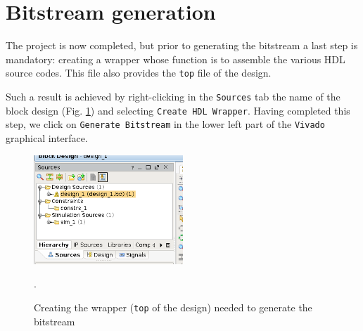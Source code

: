 \documentclass[10pt,oneside]{article}
\begin{document}
%

\section{Bitstream generation}

The project is now completed, but prior to generating the bitstream a last step
is mandatory: creating a wrapper whose function is to assemble the various HDL source
codes. This file also provides the {\tt top} file of the design.

Such a result is achieved by right-clicking in the {\tt Sources} tab the name
of the block design (Fig. \ref{createHDLWrapper}) and selecting {\tt Create HDL Wrapper}.
Having completed this step, we click on {\tt Generate Bitstream} in the lower left part of the {\tt Vivado}
graphical interface.

\begin{figure}[h!tb]
\begin{center}
\includegraphics[width=0.5\textwidth]{createHDLWrapper}
\end{center}
\caption{Creating the wrapper ({\tt top} of the design) needed to generate the
bitstream}.
\label{createHDLWrapper}
\end{figure}
\end{document}
